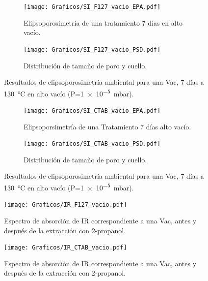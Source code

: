 		   \begin{figure}
			  	\begin{subfigure}{0.495\textwidth}
			  	\texttt{[image: Graficos/SI\_F127\_vacio\_EPA.pdf]}
				\caption{Elipsoporosimetría de una \pdmF\space tratamiento 7 días en alto vacío.}
				\label{fig:F127_vacio_EPA}
				\end{subfigure}
				\begin{subfigure}{0.495\textwidth}
			  	\texttt{[image: Graficos/SI\_F127\_vacio\_PSD.pdf]}
				\caption{Distribución de tamaño de poro y cuello.\\ }
				\label{fig:F127_vacio_PSD}
				\end{subfigure}
				\caption[Elipsoporosimetría \pdmF\space tratamiento alto vacío.]{Resultados de elipsoporosimetría ambiental para una Vac\pdmF, 7 días a \SI{130}{\celsius} en alto vacío (P=\SI{1e-5}{\milli\bar}).}
				\end{figure}
		
		  \begin{figure}
		  	\begin{subfigure}{0.495\textwidth}
		  	\texttt{[image: Graficos/SI\_CTAB\_vacio\_EPA.pdf]}
			\caption{Elipsoporsimetría de una \pdmC\space Tratamiento 7 días alto vacío.}
			\label{fig:CTAB_vacio_EPA}
			\end{subfigure}
			\begin{subfigure}{0.495\textwidth}
		  	\texttt{[image: Graficos/SI\_CTAB\_vacio\_PSD.pdf]}
			\caption{Distribución de tamaño de poro y cuello.\\ }
			\label{fig:CTAB_vacio_PSD}
			\end{subfigure}
			\caption[Elipsoporosimetría \pdmC\space tratamiento alto vacío.]{Resultados de elipsoporosimetría ambiental para una Vac\pdmC, 7 días a \SI{130}{\celsius} en alto vacío (P=\SI{1e-5}{\milli\bar}).}
			\end{figure} 	
		
         \begin{figure}
			 	\centering
			 	\texttt{[image: Graficos/IR\_F127\_vacio.pdf]}
			 	\caption[FTIR \pdmF\space tratamiento prolongado.]{Espectro de absorción de IR correspondiente a una Vac\pdmF, antes y después de la extracción con 2-propanol.}
			 	\label{fig:IR_F127_vacio}
			    \end{figure}
					
		 \begin{figure}
			 	\centering
			 	\texttt{[image: Graficos/IR\_CTAB\_vacio.pdf]}
			 	\caption[FTIR \pdmC\space tratamiento prolongado.]{Espectro de absorción de IR correspondiente a una Vac\pdmC, antes y después de la extracción con 2-propanol.}
			 	\label{fig:IR_CTAB_vacio}
			 	\end{figure}

